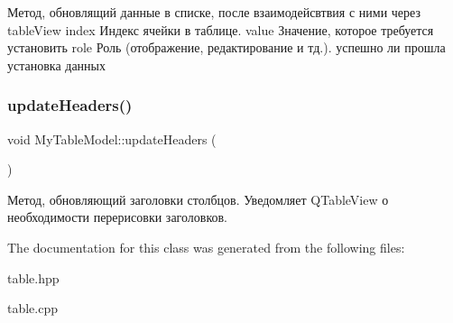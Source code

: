 Метод, обновлящий данные в списке, после взаимодейсвтвия с ними через table\+View index Индекс ячейки в таблице. value Значение, которое требуется установить role Роль (отображение, редактирование и тд.). успешно ли прошла установка данных \mbox{\label{class_my_table_model_adfcdee0f5dc44c611cc8e1cfd4fec6dd}} 
\subsubsection{\texorpdfstring{updateHeaders()}{updateHeaders()}}
{\footnotesize\ttfamily void My\+Table\+Model\+::update\+Headers (\begin{DoxyParamCaption}{ }\end{DoxyParamCaption})}

Метод, обновляющий заголовки столбцов. Уведомляет Q\+Table\+View о необходимости перерисовки заголовков. 

The documentation for this class was generated from the following files\+:\begin{DoxyCompactItemize}
\item 
table.\+hpp\item 
table.\+cpp\end{DoxyCompactItemize}
